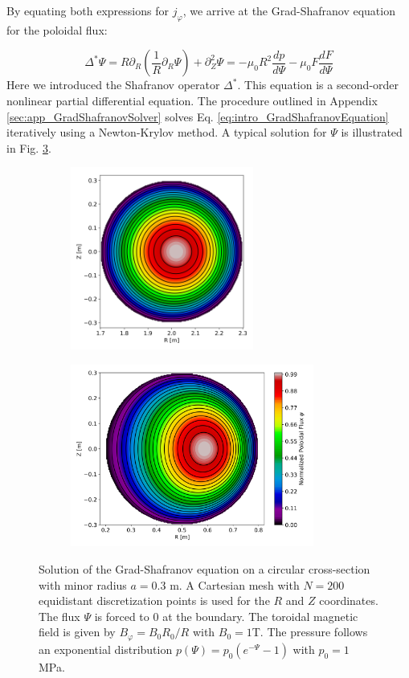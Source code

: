 By equating both expressions for $j_\varphi$, we arrive at the Grad-Shafranov equation\cite{grad1958hydromagnetic,shafranov1957equilibrium} for the poloidal flux:

\begin{equation}
	\label{eq:intro_GradShafranovEquation}
	\Delta^* \Psi = R\partial_R\left(\frac{1}{R}\partial_R\Psi\right) + \partial_Z^2\Psi = -\mu_0R^2\frac{dp}{d\Psi} - \mu_0 F \frac{dF}{d\Psi}
\end{equation}
Here we introduced the Shafranov operator $\Delta^*$.
This equation is a second-order nonlinear partial differential equation. The procedure outlined in Appendix \ref{sec:app_GradShafranovSolver} solves Eq. \ref{eq:intro_GradShafranovEquation} iteratively using a Newton-Krylov method. A typical solution for $\Psi$ is illustrated in Fig. \ref{fig:1_PsiFlux}.

\begin{figure}[H]
	\centering
	\begin{subfigure}[b]{0.45\textwidth}
		\centering
		\includegraphics[height=60mm]{schemes/Psi_GradShafranov_R_2.png}
		\label{fig:GS_PSI_R_2}
	\end{subfigure}
	\begin{subfigure}[b]{0.45\textwidth}
		\centering
		\includegraphics[height=60mm]{schemes/Psi_GradShafranov_R_0_5.png}
		\label{fig:GS_PSI_R_0_5}
	\end{subfigure}
	\caption{Solution of the Grad-Shafranov equation on a circular cross-section with minor radius $a = 0.3$ m. A Cartesian mesh with $N = 200$ equidistant discretization points is used for the $R$ and $Z$ coordinates. The flux $\Psi$ is forced to 0 at the boundary. The toroidal magnetic field is given by $B_\varphi = B_0 R_0 / R$ with $B_0 = 1$T. The pressure follows an exponential distribution $p(\Psi) = p_0 (e^{-\Psi} - 1)$ with $p_0 = 1$ MPa.}
	\label{fig:1_PsiFlux}
\end{figure}

